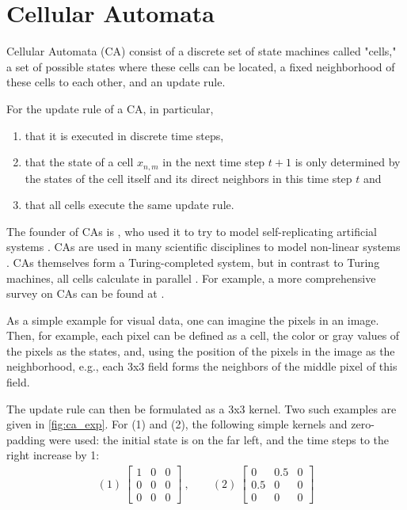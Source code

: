 \section{Cellular Automata}
\label{methods:CA}
Cellular Automata (CA) consist of a discrete set of state machines called "cells," a set of possible states where these cells can be located, a fixed neighborhood of these cells to each other, and an update rule. 

For the update rule of a CA, in particular, \begin{enumerate}
    \item that it is executed in discrete time steps,
    \item that the state of a cell $x_{n,m}$ in the next time step $t+1$ is only determined by the states of the cell itself and its direct neighbors in this time step $t$ and
    \item that all cells execute the same update rule.
\end{enumerate}

The founder of CAs is \autocite{vonNeumann:1951}, who used it to try to model self-replicating artificial systems \autocite{Kari:2005:CA_survey}. CAs are used in many scientific disciplines to model non-linear systems \autocite{Pade:2023:HirarchicalNCA}. CAs themselves form a Turing-completed system, but in contrast to Turing machines, all cells calculate in parallel \autocite{Berto:StanfordSurvey_CA:2022}. For example, a more comprehensive survey on CAs can be found at \autocite{Berto:StanfordSurvey_CA:2022}.

As a simple example for visual data, one can imagine the pixels in an image. Then, for example, each pixel can be defined as a cell, the color or gray values of the pixels as the states, and, using the position of the pixels in the image as the neighborhood, e.g., each 3x3 field forms the neighbors of the middle pixel of this field.

The update rule can then be formulated as a 3x3 kernel. Two such examples are given in \ref{fig:ca_exp}. For (1) and (2), the following simple kernels and zero-padding were used: the initial state is on the far left, and the time steps to the right increase by 1:
\begin{align*}
    (1)\    \begin{bmatrix}
                1 & 0 & 0\\
                0 & 0 & 0\\
                0 & 0 & 0
            \end{bmatrix}
            \ , \qquad
    (2)\    \begin{bmatrix}
                0   & 0.5 & 0\\
                0.5 & 0   & 0\\
                0   & 0   & 0
            \end{bmatrix}\\
\end{align*}


